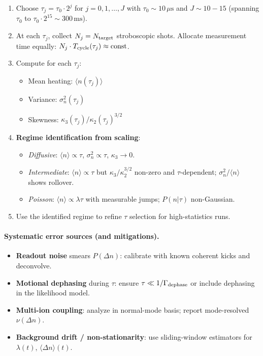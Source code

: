 \begin{enumerate}
\item Choose $\tau_j = \tau_0 \cdot 2^j$ for $j = 0, 1, \ldots, J$ 
  with $\tau_0 \sim 10\,\mu\text{s}$ and $J \sim 10{-}15$ 
  (spanning $\tau_0$ to $\tau_0 \cdot 2^{15} \sim 300\,\text{ms}$).

\item At each $\tau_j$, collect $N_j = N_{\rm target}$ stroboscopic shots. 
  Allocate measurement time equally: $N_j \cdot T_{\rm cycle}(\tau_j) \approx \text{const}$.

\item Compute for each $\tau_j$:
  \begin{itemize}
    \item Mean heating: $\langle n(\tau_j) \rangle$
    \item Variance: $\sigma_n^2(\tau_j)$
    \item Skewness: $\kappa_3(\tau_j) / \kappa_2(\tau_j)^{3/2}$
  \end{itemize}

\item \textbf{Regime identification from scaling}:
  \begin{itemize}
    \item \emph{Diffusive}: $\langle n \rangle \propto \tau$, 
      $\sigma_n^2 \propto \tau$, $\kappa_3 \to 0$.
    \item \emph{Intermediate}: $\langle n \rangle \propto \tau$ 
      but $\kappa_3/\kappa_2^{3/2}$ non-zero and $\tau$-dependent; 
      $\sigma_n^2/\langle n \rangle$ shows rollover.
    \item \emph{Poisson}: $\langle n \rangle \propto \lambda\tau$ 
      with measurable jumps; $P(n|\tau)$ non-Gaussian.
  \end{itemize}

\item Use the identified regime to refine $\tau$ selection for high-statistics runs.
\end{enumerate}

\paragraph{Systematic error sources (and mitigations).}
\begin{itemize}\itemsep0.2em
  \item \textbf{Readout noise} smears $P(\Delta n)$: calibrate with known coherent kicks and deconvolve.
  \item \textbf{Motional dephasing} during $\tau$: ensure $\tau \ll 1/\Gamma_{\rm dephase}$ or include dephasing in the likelihood model.
  \item \textbf{Multi-ion coupling}: analyze in normal-mode basis; report mode-resolved $\nu(\Delta n)$.
  \item \textbf{Background drift / non-stationarity}: use sliding-window estimators for $\lambda(t)$, $\langle \Delta n \rangle(t)$.
\end{itemize}

